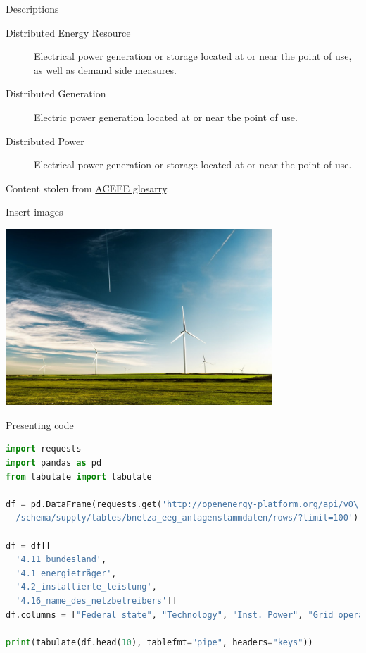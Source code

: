 \documentclass[ignorenonframetext,aspectratio=169]{beamer}
\begin{document}
\begin{frame}{Descriptions}

\begin{description}
\item[Distributed Energy Resource]
Electrical power generation or storage located at or near the point of
use, as well as demand side measures.
\item[Distributed Generation]
Electric power generation located at or near the point of use.
\item[Distributed Power]
Electrical power generation or storage located at or near the point of
use.
\end{description}

\footnotesize Content stolen from
\href{https://aceee.org/glossary_data}{ACEEE glosarry}.

\end{frame}

\begin{frame}{Insert images}
\protect\hypertarget{insert-images}{}

\center

\includegraphics[width=0.75\textwidth,height=\textheight]{img/createria-ZYu6P9-Glic-unsplash_resized.jpg}

\end{frame}

\begin{frame}[fragile]{Presenting code}

\begin{lstlisting}[language=Python]
import requests
import pandas as pd
from tabulate import tabulate

df = pd.DataFrame(requests.get('http://openenergy-platform.org/api/v0\
  /schema/supply/tables/bnetza_eeg_anlagenstammdaten/rows/?limit=100').json())

df = df[[
  '4.11_bundesland',
  '4.1_energieträger', 
  '4.2_installierte_leistung',
  '4.16_name_des_netzbetreibers']]
df.columns = ["Federal state", "Technology", "Inst. Power", "Grid operator"]

print(tabulate(df.head(10), tablefmt="pipe", headers="keys"))
\end{lstlisting}

\end{frame}
\end{document}
